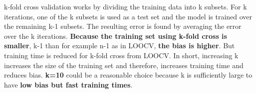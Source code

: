 k-fold cross validation works by dividing the training data into k subsets. 
For k iterations, one of the k subsets is used as a test set and the model is trained over the remaining k-1 subsets. 
The resulting error is found by averaging the error over the k iterations. 
{\bf Because the training set using k-fold cross is smaller}, k-1 than for example n-1 as in LOOCV, {\bf the bias is higher}. 
But training time is reduced for k-fold cross from LOOCV.
In short, increasing k increases the size of the training set and therefore, increases training time and reduces bias. 
{\bf k=10} could be a reasonable choice because k is sufficiently large to have {\bf low bias but fast training times}.


